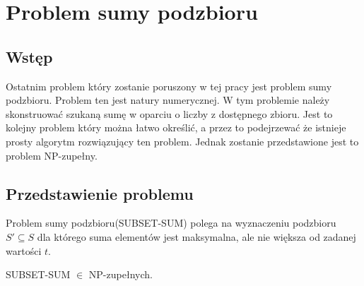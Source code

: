 \chapter{Problem sumy podzbioru}

\section{Wstęp}

Ostatnim problem który zostanie poruszony w tej pracy jest problem sumy podzbioru. Problem ten jest natury numerycznej. W tym problemie należy skonstruować szukaną sumę w oparciu o liczby z dostępnego zbioru. Jest to kolejny problem który można łatwo określić, a przez to podejrzewać że istnieje prosty algorytm rozwiązujący ten problem. Jednak zostanie przedstawione jest to problem NP-zupełny.

\section{Przedstawienie problemu}

Problem sumy podzbioru(SUBSET-SUM) polega na wyznaczeniu podzbioru $S' \subseteq S$ dla którego suma elementów jest maksymalna, ale nie większa od zadanej wartości $t$.


\begin{twr}
SUBSET-SUM $\in$ NP-zupełnych.
\end{twr}

